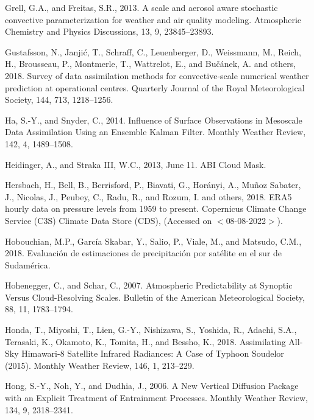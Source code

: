 \documentclass[12pt,oneside,a4paper]{reedthesis}
\begin{document}
\leavevmode\hypertarget{ref-grell2013}{}%
Grell, G.A., and Freitas, S.R., 2013. A scale and aerosol aware stochastic convective parameterization for weather and air quality modeling. Atmospheric Chemistry and Physics Discussions, 13, 9, 23845--23893.

\leavevmode\hypertarget{ref-gustafsson2018}{}%
Gustafsson, N., Janjić, T., Schraff, C., Leuenberger, D., Weissmann, M., Reich, H., Brousseau, P., Montmerle, T., Wattrelot, E., and Bučánek, A. and others, 2018. Survey of data assimilation methods for convective‐scale numerical weather prediction at operational centres. Quarterly Journal of the Royal Meteorological Society, 144, 713, 1218--1256.

\leavevmode\hypertarget{ref-ha2014}{}%
Ha, S.-Y., and Snyder, C., 2014. Influence of Surface Observations in Mesoscale Data Assimilation Using an Ensemble Kalman Filter. Monthly Weather Review, 142, 4, 1489--1508.

\leavevmode\hypertarget{ref-heidinger2013}{}%
Heidinger, A., and Straka III, W.C., 2013, June 11. ABI Cloud Mask.

\leavevmode\hypertarget{ref-era5pressure}{}%
Hersbach, H., Bell, B., Berrisford, P., Biavati, G., Horányi, A., Muñoz Sabater, J., Nicolas, J., Peubey, C., Radu, R., and Rozum, I. and others, 2018. ERA5 hourly data on pressure levels from 1959 to present. Copernicus Climate Change Service (C3S) Climate Data Store (CDS), (Accessed on \(<\)08-08-2022\(>\)).

\leavevmode\hypertarget{ref-hobouchian2018}{}%
Hobouchian, M.P., García Skabar, Y., Salio, P., Viale, M., and Matsudo, C.M., 2018. Evaluación de estimaciones de precipitación por satélite en el sur de Sudamérica.

\leavevmode\hypertarget{ref-hohenegger2007}{}%
Hohenegger, C., and Schar, C., 2007. Atmospheric Predictability at Synoptic Versus Cloud-Resolving Scales. Bulletin of the American Meteorological Society, 88, 11, 1783--1794.

\leavevmode\hypertarget{ref-honda2018}{}%
Honda, T., Miyoshi, T., Lien, G.-Y., Nishizawa, S., Yoshida, R., Adachi, S.A., Terasaki, K., Okamoto, K., Tomita, H., and Bessho, K., 2018. Assimilating All-Sky Himawari-8 Satellite Infrared Radiances: A Case of Typhoon Soudelor (2015). Monthly Weather Review, 146, 1, 213--229.

\leavevmode\hypertarget{ref-hong2006}{}%
Hong, S.-Y., Noh, Y., and Dudhia, J., 2006. A New Vertical Diffusion Package with an Explicit Treatment of Entrainment Processes. Monthly Weather Review, 134, 9, 2318--2341.
\end{document}
